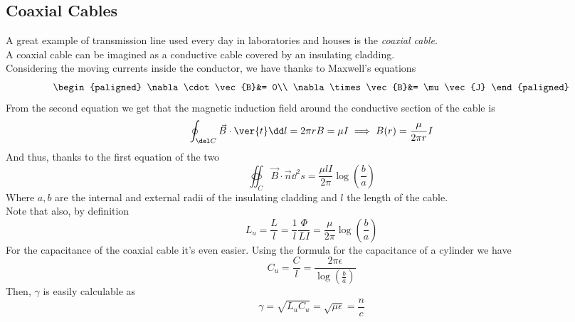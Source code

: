 \documentclass[../electromagnetism.tex]{subfiles}
\begin{document}
\subsection{Coaxial Cables}     
A great example of transmission line used every day in laboratories and houses is the \textit{coaxial cable}.\\
A coaxial cable can be imagined as a conductive cable covered by an insulating cladding.\\
Considering the moving currents inside the conductor, we have thanks to Maxwell's equations
\begin{equation*}
	\begin{paligned}
		\nabla\cdot\vec{B}&= 0\\
		\nabla\times\vec{B}&= \mu\vec{J}
	\end{paligned}
\end{equation*}
From the second equation we get that the magnetic induction field around the conductive section of the cable is
\begin{equation*}
	\oint_{\del C}\vec{B}\cdot\ver{t}\dd l=2\pi rB=\mu I\implies B(r)=\frac{\mu}{2\pi r}I
\end{equation*}
And thus, thanks to the first equation of the two
\begin{equation*}
	\oiint_{C}\vec{B}\cdot\vec{n}\dd^2s=\frac{\mu lI}{2\pi}\log\left( \frac{b}{a} \right)
\end{equation*}
Where $a, b$ are the internal and external radii of the insulating cladding and $l$ the length of the cable.\\
Note that also, by definition
\begin{equation}
	L_u=\frac{L}{l}=\frac{1}{l}\frac{\Phi}{LI}=\frac{\mu}{2\pi}\log\left( \frac{b}{a} \right)
\end{equation}
For the capacitance of the coaxial cable it's even easier. Using the formula for the capacitance of a cylinder we have
\begin{equation}
	C_u=\frac{C}{l}=\frac{2\pi\epsilon}{\log\left( \frac{b}{a} \right)}
	\label{eq:unitcapac.coax}
\end{equation}
Then, $\gamma$ is easily calculable as
\begin{equation}
	\gamma=\sqrt{L_uC_u}=\sqrt{\mu\epsilon}=\frac{n}{c}
	\label{eq:gamma.coax}
\end{equation}
\end{document}
